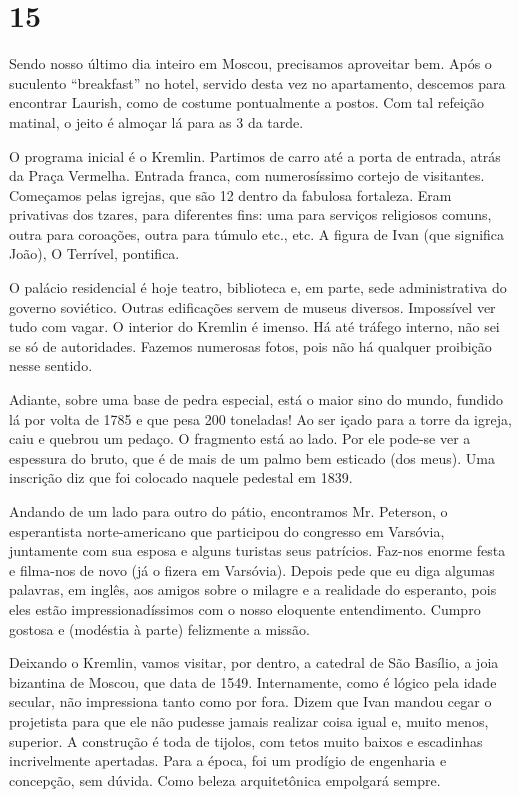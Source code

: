 \section*{15 \adfflatleafright {}}
Sendo nosso último dia inteiro em Moscou, precisamos aproveitar bem. Após o suculento ``breakfast'' no hotel, servido desta vez no apartamento, descemos para encontrar Laurish, como de costume pontualmente a postos. Com tal refeição matinal, o jeito é almoçar lá para as 3 da tarde.

O programa inicial é o Kremlin. Partimos de carro até a porta de entrada, atrás da Praça Vermelha. Entrada franca, com numerosíssimo cortejo de visitantes. Começamos pelas igrejas, que são 12 dentro da fabulosa fortaleza. Eram privativas dos tzares, para diferentes fins: uma para serviços religiosos comuns, outra para coroações, outra para túmulo etc., etc. A figura de Ivan (que significa João), O Terrível, pontifica.

O palácio residencial é hoje teatro, biblioteca e, em parte, sede administrativa do governo soviético. Outras edificações servem de museus diversos. Impossível ver tudo com vagar. O interior do Kremlin é imenso. Há até tráfego interno, não sei se só de autoridades. Fazemos numerosas fotos, pois não há qualquer proibição nesse sentido.

Adiante, sobre uma base de pedra especial, está o maior sino do mundo, fundido lá por volta de 1785 e que pesa 200 toneladas! Ao ser içado para a torre da igreja, caiu e quebrou um pedaço. O fragmento está ao lado. Por ele pode-se ver a espessura do bruto, que é de mais de um palmo bem esticado (dos meus). Uma inscrição diz que foi colocado naquele pedestal em 1839.

Andando de um lado para outro do pátio, encontramos Mr. Peterson, o esperantista norte-americano que participou do congresso em Varsóvia, juntamente com sua esposa e alguns turistas seus patrícios. Faz-nos enorme festa e filma-nos de novo (já o fizera em Varsóvia). Depois pede que eu diga algumas palavras, em inglês, aos amigos sobre o milagre e a realidade do esperanto, pois eles estão impressionadíssimos com o nosso eloquente entendimento. Cumpro gostosa e (modéstia à parte) felizmente a missão.

Deixando o Kremlin, vamos visitar, por dentro, a catedral de São Basílio, a joia bizantina de Moscou, que data de 1549. Internamente, como é lógico pela idade secular, não impressiona tanto como por fora. Dizem que Ivan mandou cegar o projetista para que ele não pudesse jamais realizar coisa igual e, muito menos, superior. A construção é toda de tijolos, com tetos muito baixos e escadinhas incrivelmente apertadas. Para a época, foi um prodígio de engenharia e concepção, sem dúvida. Como beleza arquitetônica empolgará sempre.

